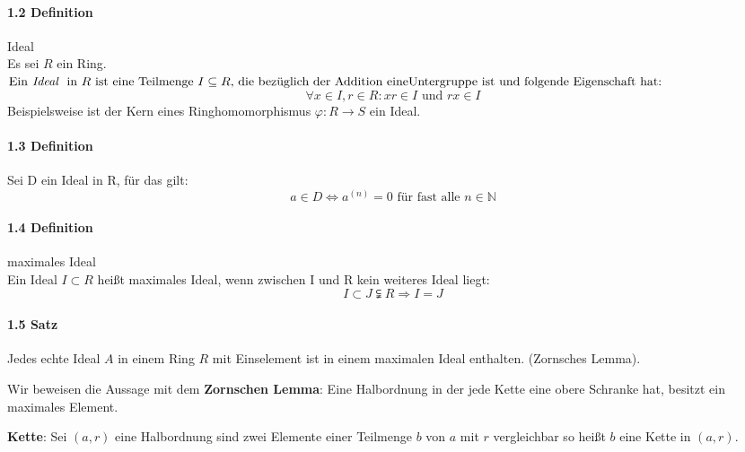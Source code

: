 \documentclass[a4paper]{article}
\begin{document}
\paragraph{1.2 Definition} Ideal \\
Es sei $ R $ ein Ring. \\ 
$ \text{Ein} \textit{ Ideal } \text{ in } R \text{ ist eine Teilmenge } I \subseteq R \text{, die bezüglich der Addition 
eine} \\ \text{Untergruppe ist und folgende Eigenschaft hat:} $
$$ \forall x \in I, r \in R: xr \in I \text{ und } rx \in I$$
Beispielsweise ist der Kern eines Ringhomomorphismus $ \varphi:R \to S $ ein Ideal. 


\paragraph{1.3 Definition} Sei D ein Ideal in R, für das gilt:  
      $$ a \in D \iff a^{(n)} = 0 \text{ für fast alle } n \in \mathbb{N}  $$

\paragraph{1.4 Definition} maximales Ideal \\
Ein Ideal $ I \subset R $ heißt maximales Ideal, wenn zwischen I und R kein weiteres Ideal liegt:
$$ I \subset J \subsetneqq R \Rightarrow I = J$$


\paragraph{1.5 Satz} Jedes echte Ideal $ A $ in einem Ring $ R $ mit Einselement ist in einem maximalen Ideal enthalten. (Zornsches Lemma).
\bigskip

Wir beweisen die Aussage mit dem \textbf{Zornschen Lemma}: Eine Halbordnung in der jede Kette eine obere Schranke hat, besitzt ein maximales Element. 
\smallskip

\textbf{Kette}: Sei $ (a,r) $ eine Halbordnung sind zwei Elemente einer Teilmenge $ b $ von $ a $ mit $ r $ vergleichbar 
so heißt $ b $ eine Kette in $ (a,r) $.
\end{document}
